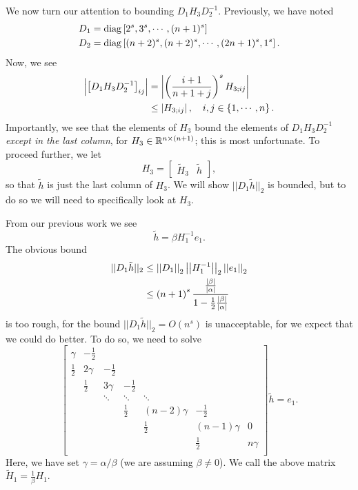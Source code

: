 We now turn our attention to bounding $D_{1}H_{3}D_{2}^{-1}$.
Previously, we have noted
%
\begin{align}
    D_{1} &= \operatorname{diag}\left[ 2^{s},3^{s},\cdots,(n+1)^{s} \right] \nonumber\\
    D_{2} &= \operatorname{diag}\left[ (n+2)^{s},(n+2)^{s},\cdots,(2n+1)^{s},1^{s} \right].
\end{align}
%
Now, we see
%
\begin{align}
    \left| \left[ D_{1}H_{3}D_{2}^{-1} \right]_{ij} \right|
        &= \left| \left( \frac{i+1}{n+1+j} \right)^{s}H_{3;ij} \right| \nonumber\\
    &\le \left| H_{3;ij} \right|, \quad
        i,j\in\left\{ 1,\cdots,n \right\}.
\end{align}
%
Importantly, we see that the elements of $H_{3}$ bound the elements
of $D_{1}H_{3}D_{2}^{-1}$ \emph{except in the last column},
for $H_{3}\in\mathbb{R}^{n\times(n+1)}$; this is most unfortunate.
To proceed further, we let
%
\begin{equation}
    H_{3} = \begin{bmatrix} \widetilde{H}_{3} & \tilde{h} \end{bmatrix},
\end{equation}
%
so that $\tilde{h}$ is just the last column of $H_{3}$.
We will show $||D_{1}\tilde{h}||_{2}$ is bounded, but to do so
we will need to specifically look at $H_{3}$.

From our previous work we see
%
\begin{equation}
    \tilde{h} = \beta H_{1}^{-1}e_{1}.
\end{equation}
%
The obvious bound
%
\begin{align}
    ||D_{1}\tilde{h}||_{2}
        &\le \left| \left| D_{1} \right| \right|_{2}\left| \left| H_{1}^{-1} \right| \right|_{2}\left| \left| e_{1} \right| \right|_{2}
        \nonumber\\
    &\le \left( n+1 \right)^{s} \frac{\frac{\left| \beta \right|}{\left| \alpha \right|}}{
        1 - \frac{1}{2}\frac{\left| \beta \right|}{\left| \alpha \right|}}
\end{align}
%
is too rough, for the bound $||D_{1}\tilde{h}||_{2} = O(n^{s})$
is unacceptable, for we expect that we could do better.
To do so, we need to solve
%
\begin{equation}
    \begin{bmatrix}
        \gamma          & -\frac{1}{2}         & \\
        \frac{1}{2} & 2\gamma & -\frac{1}{2} \\
        & \frac{1}{2} & 3\gamma & -\frac{1}{2} \\
        & & \ddots & \ddots & \ddots \\
        & & & \frac{1}{2} & (n-2)\gamma & -\frac{1}{2} \\
        & & & & \frac{1}{2} & (n-1)\gamma & 0 \\ 
        & & & & & \frac{1}{2} & n\gamma \\
    \end{bmatrix}
    \tilde{h} = e_{1}.
\end{equation}
%
Here, we have set $\gamma = \alpha/\beta$ (we are assuming $\beta\ne0$).
We call the above matrix $\widetilde{H}_{1} = \frac{1}{\beta}H_{1}$.


